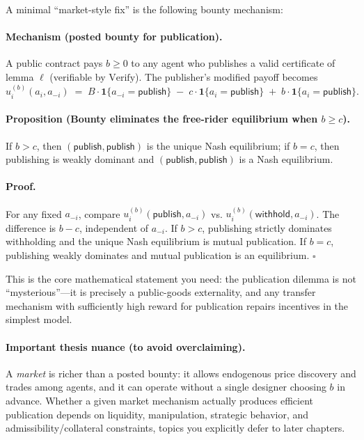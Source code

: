 A minimal ``market-style fix'' is the following bounty mechanism:

\paragraph{Mechanism (posted bounty for publication).}
A public contract pays \(b\ge 0\) to any agent who publishes a valid certificate of lemma \(\ell\) (verifiable by \(\mathrm{Verify}\)). The publisher's modified payoff becomes
\[
u_i^{(b)}(a_i,a_{-i}) \;=\; B\cdot \mathbf{1}\{a_{-i}=\mathsf{publish}\} \;-\; c\cdot \mathbf{1}\{a_i=\mathsf{publish}\} \;+\; b\cdot \mathbf{1}\{a_i=\mathsf{publish}\}.
\]

\paragraph{Proposition (Bounty eliminates the free-rider equilibrium when \(b\ge c\)).}
If \(b>c\), then \((\mathsf{publish},\mathsf{publish})\) is the unique Nash equilibrium; if \(b=c\), then publishing is weakly dominant and \((\mathsf{publish},\mathsf{publish})\) is a Nash equilibrium.

\paragraph{Proof.}
For any fixed \(a_{-i}\), compare \(u_i^{(b)}(\mathsf{publish},a_{-i})\) vs. \(u_i^{(b)}(\mathsf{withhold},a_{-i})\). The difference is \(b-c\), independent of \(a_{-i}\). If \(b>c\), publishing strictly dominates withholding and the unique Nash equilibrium is mutual publication. If \(b=c\), publishing weakly dominates and mutual publication is an equilibrium. \(\square\)

This is the core mathematical statement you need: the publication dilemma is not ``mysterious''---it is precisely a public-goods externality, and any transfer mechanism with sufficiently high reward for publication repairs incentives in the simplest model.

\paragraph{Important thesis nuance (to avoid overclaiming).}
A \emph{market} is richer than a posted bounty: it allows endogenous price discovery and trades among agents, and it can operate without a single designer choosing \(b\) in advance. Whether a given market mechanism actually produces efficient publication depends on liquidity, manipulation, strategic behavior, and admissibility/collateral constraints, topics you explicitly defer to later chapters.

